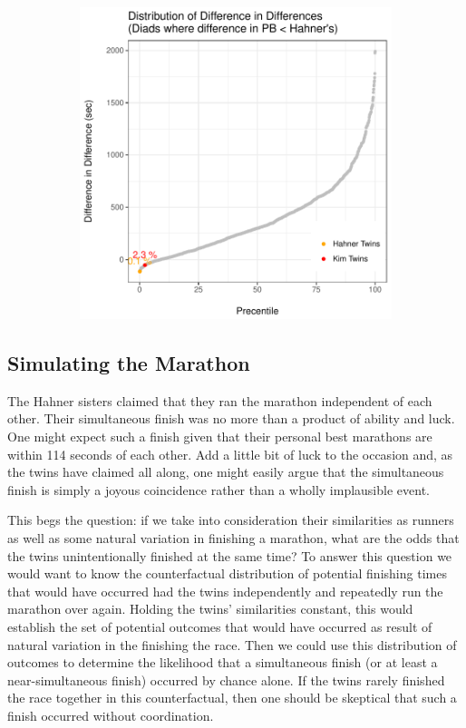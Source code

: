\documentclass[12pt,titlepage]{article}
\begin{document}
\begin{figure}[!ht]
\begin{subfigure}{.5\textwidth}
 \includegraphics[width=\textwidth, keepaspectratio]{diff_in_diff_2.pdf}
 \end{subfigure}
\end{figure}




\newpage
\subsection*{Simulating the Marathon}

The Hahner sisters claimed that they ran the marathon independent of each other.  Their simultaneous finish was no more than a product of ability and luck.  One might expect such a finish given that their personal best marathons are within 114 seconds of each other.  Add a little bit of luck to the occasion and, as the twins have claimed all along, one might easily argue that the simultaneous finish is simply a joyous coincidence rather than a wholly implausible event.

This begs the question: if we take into consideration their similarities as runners as well as some natural variation in finishing a marathon, what are the odds that the twins unintentionally finished at the same time?   To answer this question we would want to know the counterfactual distribution of potential finishing times that would have occurred had the twins independently and repeatedly run the marathon over again.  Holding the twins' similarities constant, this would establish the set of potential outcomes that would have occurred as result of natural variation in the finishing the race.   Then we could use this distribution of outcomes to determine the likelihood that a simultaneous finish (or at least a near-simultaneous finish) occurred by chance alone.   If the twins rarely finished the race together in this counterfactual, then one should be skeptical that such a finish occurred without coordination.
\end{document}

